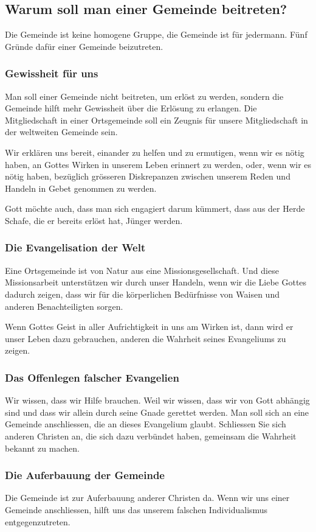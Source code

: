 \documentclass{../../inc/mybib}
\begin{document}
\subsection{Warum soll man einer Gemeinde beitreten? }
Die Gemeinde ist keine homogene Gruppe, die Gemeinde ist für jedermann. Fünf Gründe dafür einer Gemeinde beizutreten.
\subsubsection{Gewissheit für uns}
Man soll einer Gemeinde nicht beitreten, um erlöst zu werden, sondern die Gemeinde hilft mehr Gewissheit über die Erlösung zu erlangen. Die Mitgliedschaft in einer Ortsgemeinde soll ein Zeugnis für unsere Mitgliedschaft in der weltweiten Gemeinde sein.

Wir erklären uns bereit, einander zu helfen und zu ermutigen, wenn wir es nötig haben, an Gottes Wirken in unserem Leben erinnert zu werden, oder, wenn wir es nötig haben, bezüglich grösseren Diskrepanzen zwischen unserem Reden und Handeln in Gebet genommen zu werden.

Gott möchte auch, dass man sich engagiert darum kümmert, dass aus der Herde Schafe, die er bereits erlöst hat, Jünger werden.
\subsubsection{Die Evangelisation der Welt}
Eine Ortsgemeinde ist von Natur aus eine Missionsgesellschaft. Und diese Missionsarbeit unterstützen wir durch unser Handeln, wenn wir die Liebe Gottes dadurch zeigen, dass wir für die körperlichen Bedürfnisse von Waisen und anderen Benachteiligten sorgen.

Wenn Gottes Geist in aller Aufrichtigkeit in uns am Wirken ist, dann wird er unser Leben dazu gebrauchen, anderen die Wahrheit seines Evangeliums zu zeigen.
\subsubsection{Das Offenlegen falscher Evangelien}
Wir wissen, dass wir Hilfe brauchen. Weil wir wissen, dass wir von Gott abhängig sind und dass wir allein durch seine Gnade gerettet werden. Man soll sich an eine Gemeinde anschliessen, die an dieses Evangelium glaubt. Schliessen Sie sich anderen Christen an, die sich dazu verbündet haben, gemeinsam die Wahrheit bekannt zu machen.
\subsubsection{Die Auferbauung der Gemeinde}
Die Gemeinde ist zur Auferbauung anderer Christen da. Wenn wir uns einer Gemeinde anschliessen, hilft uns das unserem falschen Individualismus entgegenzutreten.
\end{document}

